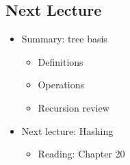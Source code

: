 \documentclass[10pt]{article}
\begin{document}
\subsection*{Next Lecture}
\begin{itemize}
    \item Summary: tree basis
    \begin{itemize}
        \item Definitions
        \item Operations
        \item Recursion review
    \end{itemize}
    \item Next lecture: Hashing
    \begin{itemize}
        \item Reading: Chapter 20
    \end{itemize}
\end{itemize}
\end{document}
